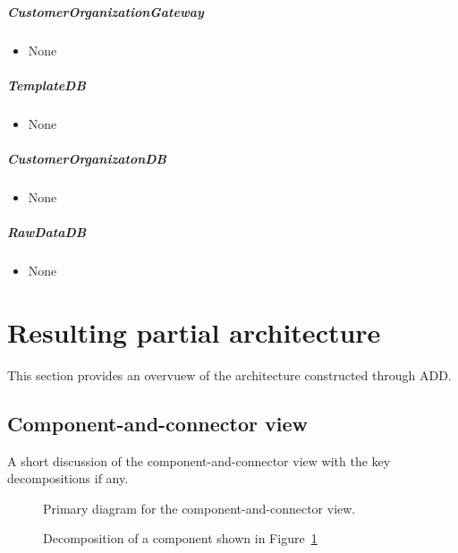 \documentclass[a4paper,10pt]{article}
\begin{document}
\subparagraph{CustomerOrganizationGateway}
\begin{itemize}
	\item None
\end{itemize}

\subparagraph{TemplateDB}
\begin{itemize}
	\item None
\end{itemize}

\subparagraph{CustomerOrganizatonDB}
\begin{itemize}
	\item None
\end{itemize}

\subparagraph{RawDataDB}
\begin{itemize}
	\item None
\end{itemize}

\section{Resulting partial architecture}\label{sec:architecture}
This section provides an overvuew of the architecture constructed through ADD\@.

\subsection{Component-and-connector view}
A short discussion of the component-and-connector view with the key
decompositions if any.

\begin{figure}[!htp]
    \centering
    \caption{Primary diagram for the component-and-connector view.
        }\label{fig:cc_main}
\end{figure}

\begin{figure}[!htp]
    \centering
    \caption{Decomposition of a component shown in Figure~\ref{fig:cc_main}
        }\label{fig:decomp_decomp1}
\end{figure}
\end{document}
